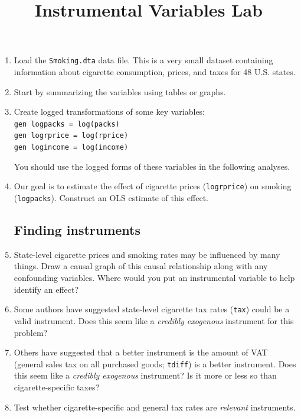 \documentclass[a4paper,12pt]{article}
\title{Instrumental Variables Lab}
\author{}
\date{}
\begin{document}
\maketitle

\vspace{-4em}

\begin{enumerate}\itemsep0.5em

\subsection*{Getting started}

\item Load the \texttt{Smoking.dta} data file. This is a very small dataset containing information about cigarette consumption, prices, and taxes for 48 U.S. states.

\item Start by summarizing the variables using tables or graphs.
\item Create logged transformations of some key variables:\\
\texttt{gen logpacks = log(packs)\\
gen logrprice = log(rprice)\\
gen logincome = log(income)}

You should use the logged forms of these variables in the following analyses.

\item Our goal is to estimate the effect of cigarette prices (\texttt{logrprice}) on smoking (\texttt{logpacks}). Construct an OLS estimate of this effect.

\subsection*{Finding instruments}

\item State-level cigarette prices and smoking rates may be influenced by many things. Draw a causal graph of this causal relationship along with any confounding variables. Where would you put an instrumental variable to help identify an effect?
\item Some authors have suggested state-level cigarette tax rates (\texttt{tax}) could be a valid instrument. Does this seem like a {\em credibly exogenous} instrument for this problem?
\item Others have suggested that a better instrument is the amount of VAT (general sales tax on all purchased goods; \texttt{tdiff}) is a better instrument. Does this seem like a {\em credibly exogenous} instrument? Is it more or less so than cigarette-specific taxes?
\item Test whether cigarette-specific and general tax rates are {\em relevant} instruments.


\end{enumerate}
\end{document}
